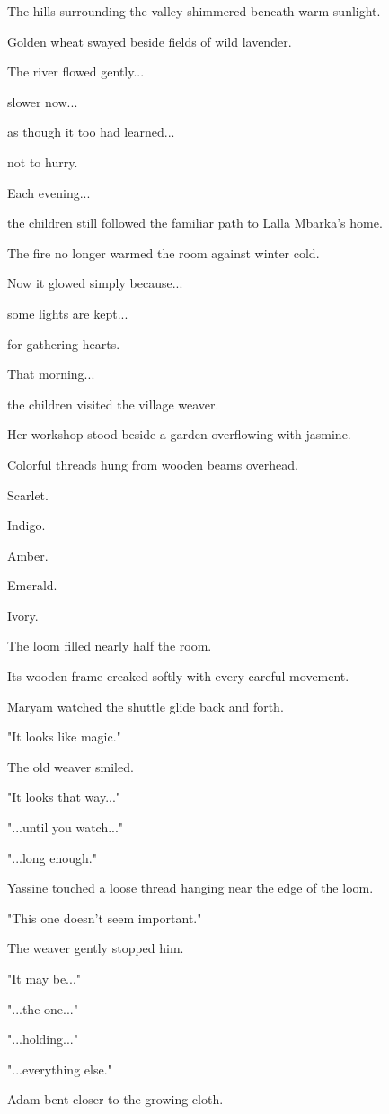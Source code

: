 \documentclass[12pt,openany]{book}
\begin{document}
The hills surrounding the valley shimmered beneath warm sunlight.

Golden wheat swayed beside fields of wild lavender.

The river flowed gently...

slower now...

as though it too had learned...

not to hurry.

Each evening...

the children still followed the familiar path to Lalla Mbarka's home.

The fire no longer warmed the room against winter cold.

Now it glowed simply because...

some lights are kept...

for gathering hearts.

That morning...

the children visited the village weaver.

Her workshop stood beside a garden overflowing with jasmine.

Colorful threads hung from wooden beams overhead.

Scarlet.

Indigo.

Amber.

Emerald.

Ivory.

The loom filled nearly half the room.

Its wooden frame creaked softly with every careful movement.

Maryam watched the shuttle glide back and forth.

"It looks like magic."

The old weaver smiled.

"It looks that way..."

"...until you watch..."

"...long enough."

Yassine touched a loose thread hanging near the edge of the loom.

"This one doesn't seem important."

The weaver gently stopped him.

"It may be..."

"...the one..."

"...holding..."

"...everything else."

Adam bent closer to the growing cloth.
\end{document}
